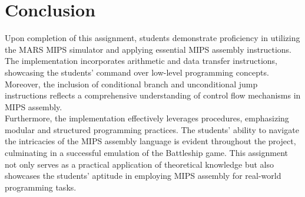 \section{Conclusion}
\qquad Upon completion of this assignment, students demonstrate proficiency in utilizing the MARS MIPS simulator and applying essential MIPS assembly instructions. The implementation incorporates arithmetic and data transfer instructions, showcasing the students' command over low-level programming concepts. Moreover, the inclusion of conditional branch and unconditional jump instructions reflects a comprehensive understanding of control flow mechanisms in MIPS assembly. \\

\qquad Furthermore, the implementation effectively leverages procedures, emphasizing modular and structured programming practices. The students' ability to navigate the intricacies of the MIPS assembly language is evident throughout the project, culminating in a successful emulation of the Battleship game. This assignment not only serves as a practical application of theoretical knowledge but also showcases the students' aptitude in employing MIPS assembly for real-world programming tasks.